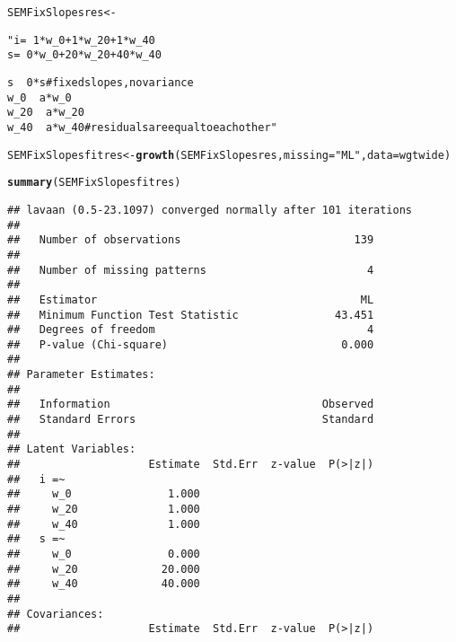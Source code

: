 \documentclass{article}\usepackage[]{graphicx}\usepackage[]{color}
\makeatletter
\newcommand{\hlstr}[1]{\textcolor[rgb]{0.192,0.494,0.8}{#1}}%
\newcommand{\hlstd}[1]{\textcolor[rgb]{0.345,0.345,0.345}{#1}}%
\newcommand{\hlkwb}[1]{\textcolor[rgb]{0.69,0.353,0.396}{#1}}%
\newcommand{\hlkwc}[1]{\textcolor[rgb]{0.333,0.667,0.333}{#1}}%
\newcommand{\hlkwd}[1]{\textcolor[rgb]{0.737,0.353,0.396}{\textbf{#1}}}%
\newenvironment{kframe}{%
 \def\at@end@of@kframe{}%
 \ifinner\ifhmode%
  \def\at@end@of@kframe{\end{minipage}}%
  \begin{minipage}{\columnwidth}%
 \fi\fi%
 \def\FrameCommand##1{\hskip\@totalleftmargin \hskip-\fboxsep
 \colorbox{shadecolor}{##1}\hskip-\fboxsep
     \hskip-\linewidth \hskip-\@totalleftmargin \hskip\columnwidth}%
 \MakeFramed {\advance\hsize-\width
   \@totalleftmargin\z@ \linewidth\hsize
   \@setminipage}}%
 {\par\unskip\endMakeFramed%
 \at@end@of@kframe}
\newenvironment{knitrout}{}{} %
\makeatother
\begin{document}
\begin{knitrout}
\color{fgcolor}\begin{kframe}
\begin{alltt}
\hlstd{SEMFixSlopesres} \hlkwb{<-} \hlstr{" i =~ 1*w_0 + 1*w_20 + 1*w_40
                  s =~ 0*w_0 + 20*w_20 + 40*w_40

                  s ~~ 0*s #fixed slopes, no variance
                  w_0 ~~ a*w_0
                  w_20 ~~ a*w_20
                  w_40 ~~ a*w_40 #residuals are equal to each other"}
\hlstd{SEMFixSlopesfitres} \hlkwb{<-} \hlkwd{growth}\hlstd{(SEMFixSlopesres,} \hlkwc{missing} \hlstd{=} \hlstr{"ML"}\hlstd{,} \hlkwc{data} \hlstd{= wgtwide)}
\end{alltt}


{\ttfamily\noindent{}}\begin{alltt}
\hlkwd{summary}\hlstd{(SEMFixSlopesfitres)}
\end{alltt}
\begin{verbatim}
## lavaan (0.5-23.1097) converged normally after 101 iterations
## 
##   Number of observations                           139
## 
##   Number of missing patterns                         4
## 
##   Estimator                                         ML
##   Minimum Function Test Statistic               43.451
##   Degrees of freedom                                 4
##   P-value (Chi-square)                           0.000
## 
## Parameter Estimates:
## 
##   Information                                 Observed
##   Standard Errors                             Standard
## 
## Latent Variables:
##                    Estimate  Std.Err  z-value  P(>|z|)
##   i =~                                                
##     w_0               1.000                           
##     w_20              1.000                           
##     w_40              1.000                           
##   s =~                                                
##     w_0               0.000                           
##     w_20             20.000                           
##     w_40             40.000                           
## 
## Covariances:
##                    Estimate  Std.Err  z-value  P(>|z|)

\end{verbatim}
\end{kframe}
\end{knitrout}
\end{document}
